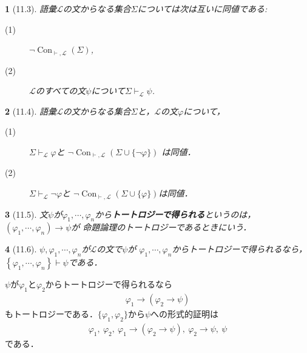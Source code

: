 \documentclass[a4j,10.5pt,oneside,openany]{jsbook}
\theoremstyle{mystyle}
\newtheorem{thm}{\color{DarkMidnightBlue}{定理}}[section]
\newtheorem{dfn}[thm]{\color{PakistanGreen}{定義}}
\newcommand{\Con}{\operatorname{Con}} %
\begin{document}
	\begin{screen}
		\begin{thm}[11.3]
			語彙$\mathcal{L}$の文からなる集合$\Sigma$については次は互いに同値である:
			\begin{description}
				\item[(1)] $\neg \Con_{\vdash,\mathcal{L}}(\Sigma)$,
				\item[(2)] $\mathcal{L}$のすべての文$\psi$について$\Sigma \vdash_{\mathcal{L}} \psi$.
			\end{description}
		\end{thm}
	\end{screen}
	
	\begin{screen}
		\begin{thm}[11.4]
			語彙$\mathcal{L}$の文からなる集合$\Sigma$と，$\mathcal{L}$の文$\varphi$について，
			\begin{description}
				\item[(1)] $\Sigma \vdash_{\mathcal{L}} \varphi$と
					$\neg \Con_{\vdash,\mathcal{L}}(\Sigma \cup \{\neg \varphi\})$
					は同値．
				\item[(2)] $\Sigma \vdash_{\mathcal{L}} \neg \varphi$と
					$\neg \Con_{\vdash,\mathcal{L}}(\Sigma \cup \{\varphi\})$は同値．
			\end{description}
		\end{thm}
	\end{screen}
	
	\begin{screen}
		\begin{dfn}[11.5]
			文$\psi$が$\varphi_{1},\cdots,\varphi_{n}$から{\bf トートロジーで得られる}というのは，
			$\left(\varphi_{1},\cdots,\varphi_{n}\right) \rightarrow \psi$が
			命題論理のトートロジーであるときにいう．
		\end{dfn}
	\end{screen}
	
	\begin{screen}
		\begin{thm}[11.6]
			$\psi,\varphi_{1},\cdots,\varphi_{n}$が$\mathcal{L}$の文で$\psi$が
			$\varphi_{1},\cdots,\varphi_{n}$からトートロジーで得られるなら，
			$\left\{\varphi_{1},\cdots,\varphi_{n}\right\} \vdash \psi$である．
		\end{thm}
	\end{screen}
	
	$\psi$が$\varphi_{1}$と$\varphi_{2}$からトートロジーで得られるなら
	\begin{align}
		\varphi_{1} \rightarrow (\varphi_{2} \rightarrow \psi)
	\end{align}
	もトートロジーである．$\{\varphi_{1},\varphi_{2}\}$から$\psi$への形式的証明は
	\begin{align}
		\varphi_{1},\ \varphi_{2},\ \varphi_{1} \rightarrow (\varphi_{2} \rightarrow \psi),\ 
		\varphi_{2} \rightarrow \psi,\ \psi
	\end{align}
	である．
	
\end{document}
